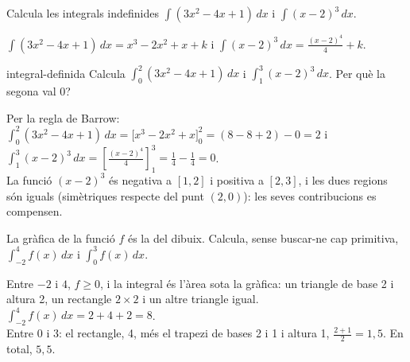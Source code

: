 \begin{apartats}

Calcula les integrals indefinides $\displaystyle\int(3x^2-4x+1)\,dx$ i $\displaystyle\int(x-2)^3\,dx$.

\begin{solucio}
$\displaystyle\int(3x^2-4x+1)\,dx=x^3-2x^2+x+k$ i $\displaystyle\int(x-2)^3\,dx=\frac{(x-2)^4}{4}+k$.
\end{solucio}

\begin{tria}{integral-definida}
Calcula $\displaystyle\int_0^2(3x^2-4x+1)\,dx$ i $\displaystyle\int_1^3(x-2)^3\,dx$. Per què la segona val 0?

\begin{solucio}
Per la regla de Barrow:
$\displaystyle\int_0^2(3x^2-4x+1)\,dx=\bigl[x^3-2x^2+x\bigr]_0^2=(8-8+2)-0=2$ i
$\displaystyle\int_1^3(x-2)^3\,dx=\left[\frac{(x-2)^4}{4}\right]_1^3=\frac14-\frac14=0$.\\
La funció $(x-2)^3$ és negativa a $[1,2]$ i positiva a $[2,3]$, i les dues regions són iguals
(simètriques respecte del punt $(2,0)$): les seves contribucions es compensen.
\end{solucio}

La gràfica de la funció $f$ és la del dibuix. Calcula, sense buscar-ne cap primitiva,
$\displaystyle\int_{-2}^4 f(x)\,dx$ i $\displaystyle\int_0^3 f(x)\,dx$.
\begin{center}
\end{center}

\begin{solucio}
Entre $-2$ i $4$, $f\ge0$, i la integral és l'àrea sota la gràfica: un triangle de base 2 i altura 2, un
rectangle $2\times2$ i un altre triangle igual. $\displaystyle\int_{-2}^4 f(x)\,dx=2+4+2=8$.\\
Entre 0 i 3: el rectangle, 4, més el trapezi de bases 2 i 1 i altura 1, $\frac{2+1}2=1{,}5$. En total,
$5{,}5$.
\end{solucio}
\end{tria}


\end{apartats}
